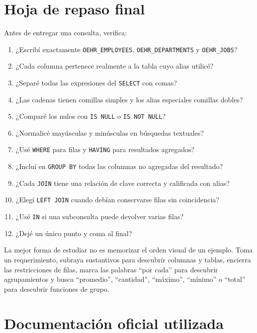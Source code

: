 \documentclass[11pt,a4paper]{article}
\newcommand{\campo}[1]{\texttt{#1}}
\newcommand{\tabla}[1]{\texttt{#1}}
\begin{document}
\fi
\section{Hoja de repaso final}

Antes de entregar una consulta, verifica:

\begin{enumerate}
  \item ¿Escribí exactamente \tabla{OEHR\_EMPLOYEES}, \tabla{OEHR\_DEPARTMENTS} y
  \tabla{OEHR\_JOBS}?
  \item ¿Cada columna pertenece realmente a la tabla cuyo alias utilicé?
  \item ¿Separé todas las expresiones del \campo{SELECT} con comas?
  \item ¿Las cadenas tienen comillas simples y los alias especiales comillas dobles?
  \item ¿Comparé los nulos con \campo{IS NULL} o \campo{IS NOT NULL}?
  \item ¿Normalicé mayúsculas y minúsculas en búsquedas textuales?
  \item ¿Usé \campo{WHERE} para filas y \campo{HAVING} para resultados agregados?
  \item ¿Incluí en \campo{GROUP BY} todas las columnas no agregadas del resultado?
  \item ¿Cada \campo{JOIN} tiene una relación de clave correcta y calificada con alias?
  \item ¿Elegí \campo{LEFT JOIN} cuando debían conservarse filas sin coincidencia?
  \item ¿Usé \campo{IN} si una subconsulta puede devolver varias filas?
  \item ¿Dejé un único punto y coma al final?
\end{enumerate}

\begin{clave}
La mejor forma de estudiar no es memorizar el orden visual de un ejemplo. Toma un requerimiento,
subraya sustantivos para descubrir columnas y tablas, encierra las restricciones de filas, marca las
palabras ``por cada'' para descubrir agrupamientos y busca ``promedio'', ``cantidad'', ``máximo'',
``mínimo'' o ``total'' para descubrir funciones de grupo.
\end{clave}

\section{Documentación oficial utilizada}
\end{document}
